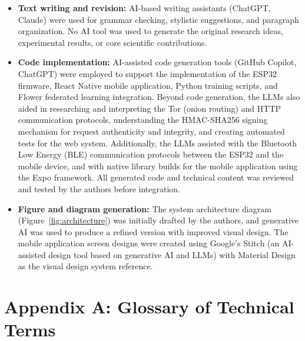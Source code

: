 \documentclass[12pt]{article}
\begin{document}
\begin{itemize}
    \item \textbf{Text writing and revision:} AI-based writing assistants (ChatGPT, Claude) were used for grammar checking, stylistic suggestions, and paragraph organization. No AI tool was used to generate the original research ideas, experimental results, or core scientific contributions.
    \item \textbf{Code implementation:} AI-assisted code generation tools (GitHub Copilot, ChatGPT) were employed to support the implementation of the ESP32 firmware, React Native mobile application, Python training scripts, and Flower federated learning integration. Beyond code generation, the LLMs also aided in researching and interpreting the Tor (onion routing) and HTTP communication protocols, understanding the HMAC-SHA256 signing mechanism for request authenticity and integrity, and creating automated tests for the web system. Additionally, the LLMs assisted with the Bluetooth Low Energy (BLE) communication protocols between the ESP32 and the mobile device, and with native library builds for the mobile application using the Expo framework. All generated code and technical content was reviewed and tested by the authors before integration.
    \item \textbf{Figure and diagram generation:} The system architecture diagram (Figure~\ref{fig:architecture}) was initially drafted by the authors, and generative AI was used to produce a refined version with improved visual design. The mobile application screen designs were created using Google's Stitch (an AI-assisted design tool based on generative AI and LLMs) with Material Design as the visual design system reference.
\end{itemize}




\appendix
\section*{Appendix A: Glossary of Technical Terms}
\label{app:glossary}

\begingroup
\small
\setlength{\tabcolsep}{4pt}
\renewcommand{\arraystretch}{1.08}
\end{document}
